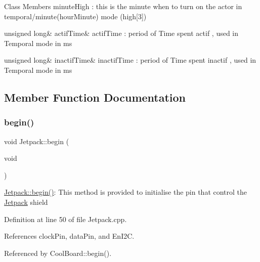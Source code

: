 \begin{DoxyFields}{Class Members}
minute\+High \+: this is the minute when to turn on the actor in temporal/minute(hour\+Minute) mode (high\mbox{[}3\mbox{]}) \\
\hline

\mbox{\label{class_jetpack_af2e1cc323ef9ffcc3cf4d203f85d726b}} 
unsigned long&
actifTime&
actif\+Time \+: period of Time spent actif , used in Temporal mode in ms \\
\hline

\mbox{\label{class_jetpack_aaf817b1f9e7a4d65b9e3ca4726b281f6}} 
unsigned long&
inactifTime&
inactif\+Time \+: period of Time spent inactif , used in Temporal mode in ms \\
\hline

\end{DoxyFields}


\subsection{Member Function Documentation}
\mbox{\label{class_jetpack_a5a53e1ebf7aaf3bf3e0d37ea64ca09a7}} 
\subsubsection{\texorpdfstring{begin()}{begin()}}
{\footnotesize\ttfamily void Jetpack\+::begin (\begin{DoxyParamCaption}\item[{void}]{ }\end{DoxyParamCaption})}

\hyperlink{class_jetpack_a5a53e1ebf7aaf3bf3e0d37ea64ca09a7}{Jetpack\+::begin()}\+: This method is provided to initialise the pin that control the \hyperlink{class_jetpack}{Jetpack} shield 

Definition at line 50 of file Jetpack.\+cpp.



References clock\+Pin, data\+Pin, and En\+I2C.



Referenced by Cool\+Board\+::begin().

